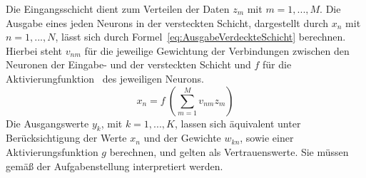 \documentclass[times, 11pt,twocolumn]{article}
\begin{document}
Die Eingangsschicht dient zum Verteilen der Daten $z_m$ mit $m=1,...,M$. Die Ausgabe eines jeden Neurons in der versteckten Schicht, dargestellt durch $x_n$ mit $n=1,...,N$, lässt sich durch Formel~\ref{eq:AusgabeVerdeckteSchicht} berechnen. Hierbei steht $v_{nm}$ für die jeweilige Gewichtung der Verbindungen zwischen den Neuronen der Eingabe- und der versteckten Schicht und $f$ für die Aktivierungfunktion~\cite{NNStanley}\cite{NNHaykin} des jeweiligen Neurons. 
\footnotesize
\begin{equation} 
x_n = f~(\sum_{m=1}^M v_{nm}z_m)
	\label{eq:AusgabeVerdeckteSchicht}
\end{equation}
\small
Die Ausgangswerte $y_k$, mit $k=1,...,K$, lassen sich äquivalent unter Berücksichtigung der Werte $x_n$ und der Gewichte $w_{kn}$, sowie einer Aktivierungsfunktion $g$ berechnen, und gelten als Vertrauenswerte. Sie müssen gemäß der Aufgabenstellung interpretiert werden. 
\end{document}
